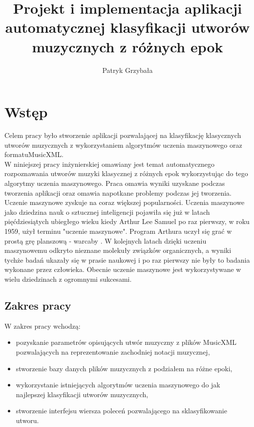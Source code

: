 \documentclass[printmode, eng, openany]{mgr}
\title{Projekt i implementacja aplikacji automatycznej klasyfikacji utworów muzycznych z różnych epok}
\author{Patryk Grzybała}
\newcommand\blankpage{%
    \null
    \thispagestyle{empty}%
    \addtocounter{page}{-1}%
    \newpage}
\newcommand\tab[1][1cm]{\hspace*{#1}}
\begin{document}
\maketitle
\blankpage
\tableofcontents
{
\listoffigures

\listoftables
}
\chapter{Wstęp}
\tab Celem pracy było stworzenie aplikacji pozwalającej na klasyfikację klasycznych utworów muzycznych z wykorzystaniem algorytmów uczenia maszynowego oraz formatu\linebreak MusicXML.\\
\tab W niniejszej pracy inżynierskiej omawiany jest temat automatycznego rozpoznawania utworów muzyki klasycznej z różnych epok wykorzystując do tego algorytmy uczenia maszynowego. Praca omawia wyniki uzyskane podczas tworzenia aplikacji oraz omawia napotkane problemy podczas jej tworzenia. \\

\tab Uczenie maszynowe zyskuje na coraz większej popularności. Uczenia maszynowe jako dziedzina nauk o sztucznej inteligencji pojawiła się już w latach pięćdziesiątych ubiegłego wieku kiedy Arthur Lee Samuel po raz pierwszy, w roku 1959, użył terminu "uczenie maszynowe". Program Arthura uczył się grać w prostą grę planszową - warcaby \cite{mlearn}. \linebreak W kolejnych latach dzięki uczeniu maszynowemu odkryto nieznane molekuły związków organicznych, a wyniki tychże badań ukazały się w prasie naukowej i po raz pierwszy nie były to badania wykonane przez człowieka. Obecnie uczenie maszynowe jest wykorzystywane w wielu dziedzinach z ogromnymi sukcesami.
\section{Zakres pracy}
\tab W zakres pracy wchodzą:
\begin{itemize}
\item pozyskanie parametrów opisujących utwór muzyczny z plików MusicXML \cite{mxml} pozwalających na reprezentowanie zachodniej notacji muzycznej,
\item stworzenie bazy danych plików muzycznych z podziałem na różne epoki,
\item wykorzystanie istniejących algorytmów uczenia maszynowego do jak najlepszej klasyfikacji utworów muzycznych,
\item stworzenie interfejsu wiersza poleceń pozwalającego na sklasyfikowanie utworu.
\end{itemize}
\end{document}
